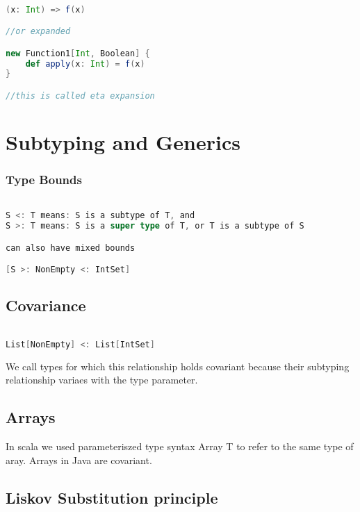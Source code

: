 \documentclass[10pt, a4paper]{report}
\begin{document}
\begin{lstlisting}[language=scala]

(x: Int) => f(x)

//or expanded

new Function1[Int, Boolean] {
	def apply(x: Int) = f(x)
}

//this is called eta expansion

\end{lstlisting}

\section{Subtyping and Generics}

\subsubsection{Type Bounds}

\begin{lstlisting}[language=scala]

S <: T means: S is a subtype of T, and
S >: T means: S is a super type of T, or T is a subtype of S

can also have mixed bounds

[S >: NonEmpty <: IntSet]

\end{lstlisting}

\subsection{Covariance}

\begin{lstlisting}[language=scala]

List[NonEmpty] <: List[IntSet]

\end{lstlisting}

We call types for which this relationship holds covariant because their subtyping relationship variaes with the type parameter.

\subsection{Arrays}

In scala we used parameteriszed type syntax Array T to refer to the same type of aray. Arrays in Java are covariant. 

\subsection{Liskov Substitution principle}
\end{document}
